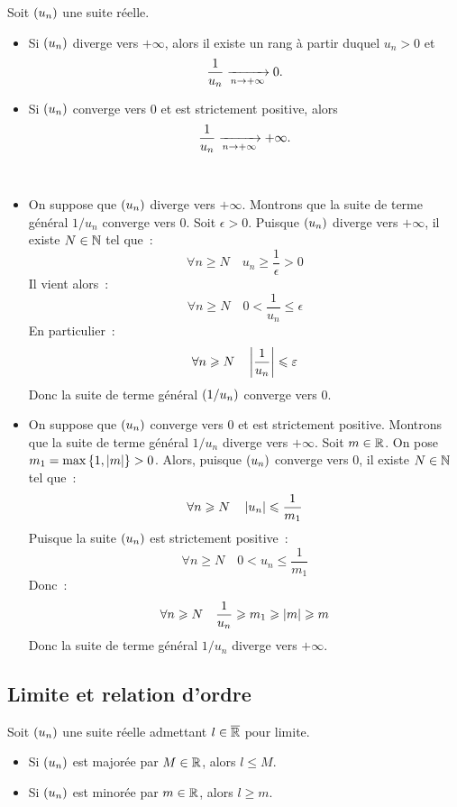 \documentclass{magnolia}
\begin{document}
\begin{proposition}[utile=-3]
Soit $\left(u_n\right)$ une suite réelle.
\begin{itemize}
\item Si $\left(u_n\right)$ diverge vers $+\infty$, alors il existe un rang à partir
  duquel $u_n>0$ et
  \[\frac{1}{u_n} \xrightarrow[n\rightarrow +\infty]{} 0.\]
\item Si $\left(u_n\right)$ converge vers 0 et est strictement positive, alors
  \[\frac{1}{u_n} \xrightarrow[n\rightarrow +\infty]{} +\infty.\]
\end{itemize}
\end{proposition}

\begin{preuve}
$\quad$
\begin{itemize}
\item On suppose que $\left(u_n\right)$ diverge vers $+\infty$. Montrons
  que la suite de terme général $1/u_n$ converge vers 0. Soit $\epsilon>0$.
  Puisque $\left(u_n\right)$ diverge vers $+\infty$, il existe $N\in\mathbb{N}$ tel que~:
  \[\forall n\geq N \quad u_n \geq \frac{1}{\epsilon} > 0\]
  Il vient alors~:
  \[\forall n\geq N \quad 0 < \frac{1}{u_n} \leq \epsilon\]
  En particulier~:
  \[\forall n\geqslant N \quad \left|\frac{1}{u_n}\right| \leqslant \varepsilon\]
  Donc la suite de terme général $\left(1/u_n\right)$ converge vers 0.
\item On suppose que $\left(u_n\right)$ converge vers 0 et est strictement positive.
  Montrons que la suite de terme général $1/u_n$ diverge vers $+\infty$.
  Soit $m\in\mathbb{R}$. On pose $m_1=\max\left\{1,\left|m\right|\right\}>0$. Alors, puisque
  $\left(u_n\right)$ converge vers 0, il existe $N\in\mathbb{N}$ tel que~:
  \[\forall n\geqslant N \quad \left|u_n\right| \leqslant \frac{1}{m_1}\]
  Puisque la suite $\left(u_n\right)$ est strictement positive~:
  \[\forall n\geq N \quad 0 < u_n \leq \frac{1}{m_1}\]
  Donc~:
  \[\forall n\geqslant N \quad \frac{1}{u_n} \geqslant m_1 \geqslant \left|m\right| \geqslant m\]
  Donc la suite de terme général $1/u_n$ diverge vers $+\infty$.
\end{itemize}
\end{preuve}


\subsection{Limite et relation d'ordre}

\begin{proposition}[utile=-3]
Soit $\left(u_n\right)$ une suite réelle admettant $l\in\overline{\mathbb{R}}$ pour limite.
\begin{itemize}
\item Si $\left(u_n\right)$ est majorée par $M\in\mathbb{R}$, alors $l\leq M$.
\item Si $\left(u_n\right)$ est minorée par $m\in\mathbb{R}$, alors $l\geq m$.
\end{itemize}
\end{proposition}
\end{document}
